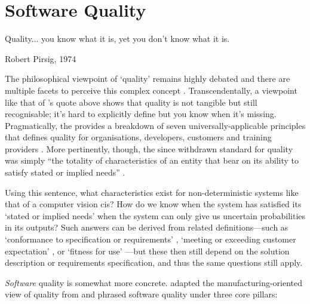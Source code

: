 \section{Software Quality}
\label{sec:background:software-quality}

\epigraph{Quality... you know what it is, yet you don't know what it is.}{Robert Pirsig, 1974 \citep{Pirsig:1974vs}}

\noindent
The philosophical viewpoint of `quality' remains highly debated and there are multiple facets to perceive this complex concept \citep{Garvin:1984vf}. Transcendentally, a viewpoint like that of \citeauthor{Pirsig:1974vs}'s quote above shows that quality is not tangible but still recognisable; it's hard to explicitly define but you know when it's missing. Pragmatically, the \citeauthor{ISO8402:1986} provides a breakdown of seven universally-applicable principles that defines quality for organisations, developers, customers and training providers \citep{ISO9000:2015}. More pertinently, though, the since withdrawn \citeyear{ISO8402:1986} standard for quality was simply ``the totality of characteristics of an entity that bear on its ability to satisfy stated or implied needs'' \citep{ISO8402:1986}.

Using this sentence, what characteristics exist for non-deterministic systems like that of a computer vision \gls{cis}? How do we know when the system has satisfied its `stated or implied needs' when the system can only give us uncertain probabilities in its outputs? Such answers can be derived from related definitions---such as `conformance to specification or requirements' \citep{Gilmore:1974um,Crosby:1979uy}, `meeting or exceeding customer expectation' \citep{Parasuraman:1988wh}, or `fitness for use' \citep{Juran:1988tg}---but these then still depend on the solution description or requirements specification, and thus the same questions still apply.

\textit{Software} quality is somewhat more concrete. \citet{Pressman:2005vf} adapted the manufacturing-oriented view of quality from \citep{Bessin:2004vc} and phrased software quality under three core pillars:

